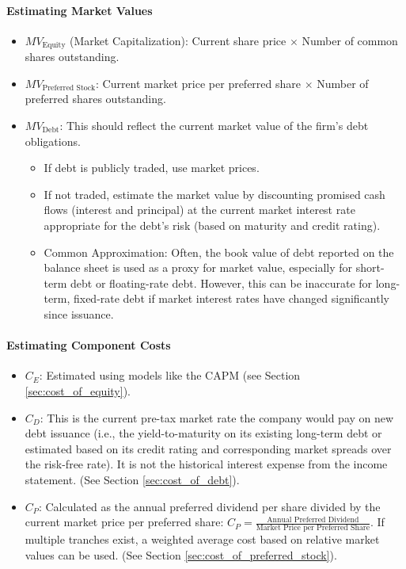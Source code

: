 \paragraph{Estimating Market Values}
\begin{itemize}
    \item \(MV_{\text{Equity}}\) (Market Capitalization): Current share price \(\times\) Number of common shares outstanding.
    \item \(MV_{\text{Preferred Stock}}\): Current market price per preferred share \(\times\) Number of preferred shares outstanding.
    \item \(MV_{\text{Debt}}\): This should reflect the current market value of the firm's debt obligations.
          \begin{itemize}
              \item If debt is publicly traded, use market prices.
              \item If not traded, estimate the market value by discounting promised cash flows (interest and principal) at the current market interest rate appropriate for the debt's risk (based on maturity and credit rating).
              \item Common Approximation: Often, the book value of debt reported on the balance sheet is used as a proxy for market value, especially for short-term debt or floating-rate debt. However, this can be inaccurate for long-term, fixed-rate debt if market interest rates have changed significantly since issuance.
          \end{itemize}
\end{itemize}

\paragraph{Estimating Component Costs}
\begin{itemize}
    \item \(C_E\): Estimated using models like the CAPM (see Section \ref{sec:cost_of_equity}).
    \item \(C_D\): This is the current pre-tax market rate the company would pay on new debt issuance (i.e., the yield-to-maturity on its existing long-term debt or estimated based on its credit rating and corresponding market spreads over the risk-free rate). It is not the historical interest expense from the income statement. (See Section \ref{sec:cost_of_debt}).
    \item \(C_P\): Calculated as the annual preferred dividend per share divided by the current market price per preferred share: \(C_P = \frac{\text{Annual Preferred Dividend}}{\text{Market Price per Preferred Share}}\). If multiple tranches exist, a weighted average cost based on relative market values can be used. (See Section \ref{sec:cost_of_preferred_stock}).
\end{itemize}


